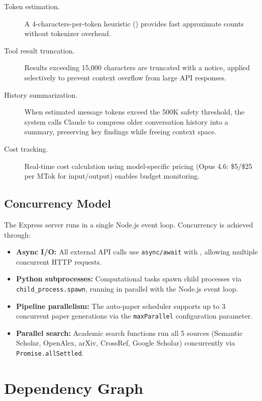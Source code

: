 \begin{description}
  \item[Token estimation.] A 4-characters-per-token heuristic () provides fast approximate counts without tokenizer overhead.
  \item[Tool result truncation.] Results exceeding 15,000 characters are truncated with a notice, applied selectively to prevent context overflow from large API responses.
  \item[History summarization.] When estimated message tokens exceed the 500K safety threshold, the system calls Claude to compress older conversation history into a summary, preserving key findings while freeing context space.
  \item[Cost tracking.] Real-time cost calculation using model-specific pricing (Opus 4.6: \$5/\$25 per MTok for input/output) enables budget monitoring.
\end{description}

\subsection{Concurrency Model}

The Express server runs in a single Node.js event loop.
Concurrency is achieved through:

\begin{itemize}
  \item \textbf{Async I/O:} All external API calls use \texttt{async/await} with , allowing multiple concurrent HTTP requests.
  \item \textbf{Python subprocesses:} Computational tasks spawn child processes via \texttt{child\_process.spawn}, running in parallel with the Node.js event loop.
  \item \textbf{Pipeline parallelism:} The auto-paper scheduler supports up to 3 concurrent paper generations via the \texttt{maxParallel} configuration parameter.
  \item \textbf{Parallel search:} Academic search functions run all 5 sources (Semantic Scholar, OpenAlex, arXiv, CrossRef, Google Scholar) concurrently via \texttt{Promise.allSettled}.
\end{itemize}

\section{Dependency Graph}
\label{sec:arch:dependencies}

